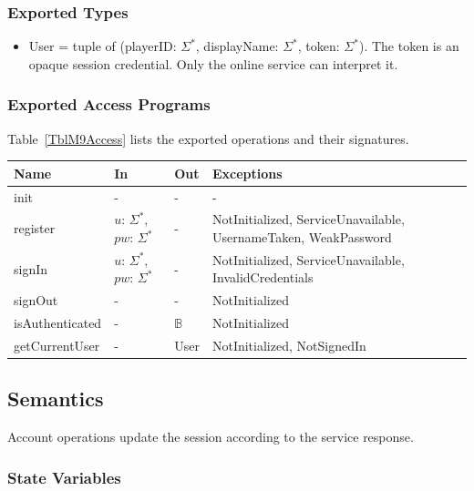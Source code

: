 \documentclass[12pt, titlepage]{article}
\begin{document}
\subsubsection{Exported Types}

\begin{itemize}
\item User = tuple of (playerID: $\Sigma^*$, displayName: $\Sigma^*$, token:
  $\Sigma^*$). The token is an opaque session credential. Only the online
  service can interpret it.
\end{itemize}

\subsubsection{Exported Access Programs}

Table~\ref{TblM9Access} lists the exported operations and their signatures.

\begin{center}
\begin{minipage}{\textwidth}
\begin{tabularx}{\textwidth}{p{3.2cm} p{3.4cm} p{2cm} X}
\toprule
\textbf{Name} & \textbf{In} & \textbf{Out} & \textbf{Exceptions} \\
\midrule
init & - & - & - \\
register & $u$: $\Sigma^*$, $pw$: $\Sigma^*$ & - & NotInitialized,
ServiceUnavailable, UsernameTaken, WeakPassword \\
signIn & $u$: $\Sigma^*$, $pw$: $\Sigma^*$ & - & NotInitialized,
ServiceUnavailable, InvalidCredentials \\
signOut & - & - & NotInitialized \\
isAuthenticated & - & $\mathbb{B}$ & NotInitialized \\
getCurrentUser & - & User & NotInitialized, NotSignedIn \\
\bottomrule
\end{tabularx}
\label{TblM9Access}
\end{minipage}
\end{center}

\subsection{Semantics}

Account operations update the session according to the service response.

\subsubsection{State Variables}
\end{document}
